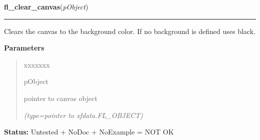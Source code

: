 \hspace{.8\funcindent}\begin{boxedminipage}{\funcwidth}

    \raggedright \textbf{fl\_clear\_canvas}(\textit{pObject})

    \vspace{-1.5ex}

    \rule{\textwidth}{0.5\fboxrule}
\setlength{\parskip}{2ex}
    Clears the canvas to the background color. If no background is defined 
    uses black.

\setlength{\parskip}{1ex}
      \textbf{Parameters}
      \vspace{-1ex}

      \begin{quote}
        \begin{Ventry}{xxxxxxx}

          \item[pObject]

          pointer to canvas object

            {\it (type=pointer to xfdata.FL\_OBJECT)}

        \end{Ventry}

      \end{quote}

\textbf{Status:} Untested + NoDoc + NoExample = NOT OK



    \end{boxedminipage}

    \label{xformslib:library:fl_modify_canvas_prop}

    \vspace{0.5ex}

